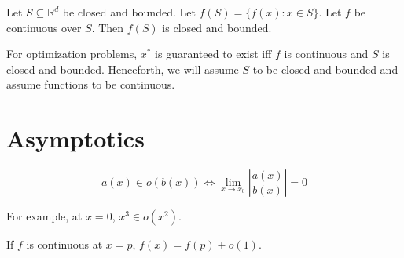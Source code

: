 \begin{theorem}
Let $S \subseteq \mathbb{R}^d$ be closed and bounded.
Let $f(S) = \{f(x): x \in S\}$.
Let $f$ be continuous over $S$.
Then $f(S)$ is closed and bounded.
\end{theorem}

For optimization problems, $x^*$ is guaranteed to exist iff
$f$ is continuous and $S$ is closed and bounded.
Henceforth, we will assume $S$ to be closed and bounded
and assume functions to be continuous.

\section{Asymptotics}

\[ a(x) \in o(b(x)) \iff \lim_{x \rightarrow x_0} \left| \frac{a(x)}{b(x)} \right| = 0\]

For example, at $x=0$, $x^3 \in o(x^2)$.

If $f$ is continuous at $x=p$, $f(x) = f(p) + o(1)$.


